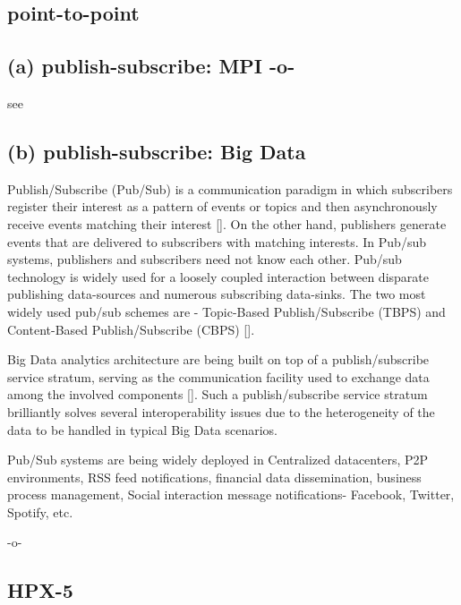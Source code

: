\subsection{point-to-point}
\subsection{ (a) publish-subscribe: MPI -o-}

     see 
     
\subsection{ (b) publish-subscribe: Big Data}

Publish/Subscribe (Pub/Sub) is a communication paradigm in which
subscribers register their interest as a pattern of events or topics
and then asynchronously receive events matching their
interest [\cite{thesis-pub-sub}].  On the other hand, publishers
generate events that are delivered to subscribers with matching
interests.  In Pub/sub systems, publishers and subscribers need not
know each other. Pub/sub technology is widely used for a loosely
coupled interaction between disparate publishing data-sources and
numerous subscribing data-sinks. The two most widely used pub/sub
schemes are - Topic-Based Publish/Subscribe (TBPS) and Content-Based
Publish/Subscribe (CBPS) [\cite{paper-pub-sub}].
      
Big Data analytics architecture are being built on top of a
publish/subscribe service stratum, serving as the communication
facility used to exchange data among the involved
components [\cite{paper-pub-sub-bigdata}]. Such a publish/subscribe
service stratum brilliantly solves several interoperability issues due
to the heterogeneity of the data to be handled in typical Big Data
scenarios.

     Pub/Sub systems are being widely deployed in Centralized
     datacenters, P2P environments, RSS feed notifications, financial
     data dissemination, business process management, Social
     interaction message notifications- Facebook, Twitter, Spotify,
     etc.

     -o-

\subsection{HPX-5}

